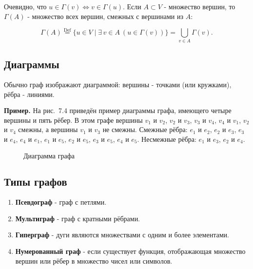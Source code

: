 {Очевидно, что $u \in \Gamma(v) \iff v \in \Gamma(u)$. Если $A \subset V$ - множество вершин, то $\Gamma(A)$ - множество всех вершин, смежных с вершинами из $A$:


\[
\Gamma(A) \overset{\text{Def}}{=} \{ u \in V \mid \exists \, v \in A\ (u \in \Gamma(v)) \} = \bigcup_{v \in A} \Gamma(v).
\]

\subsection*{Диаграммы}

Обычно граф изображают диаграммой: вершины - точками (или кружками), рёбра - линиями.

\textbf{Пример.} На рис.~7.4 приведён пример диаграммы графа, имеющего четыре вершины и пять рёбер.
В этом графе вершины $v_1$ и $v_2$, $v_2$ и $v_3$, $v_3$ и $v_4$, $v_4$ и $v_1$, $v_2$ и $v_4$ смежны, а вершины $v_1$ и $v_3$ не смежны.
Смежные рёбра: $e_1$ и $e_2$, $e_2$ и $e_3$, $e_3$ и $e_4$, $e_4$ и $e_1$, $e_1$ и $e_5$, $e_2$ и $e_5$, $e_3$ и $e_5$, $e_4$ и $e_5$.
Несмежные рёбра: $e_1$ и $e_3$, $e_2$ и $e_4$.

\begin{figure}[h]
  \centering
  \caption{Диаграмма графа}
\end{figure}

\subsection*{Типы графов}

\begin{enumerate}
    \item \textbf{Псевдограф} - граф с петлями.
    \item \textbf{Мультиграф} - граф с кратными рёбрами.
    \item \textbf{Гиперграф} - дуги являются множествами с одним и более элементами.
    \item \textbf{Нумерованный граф} - если существует функция, отображающая множество вершин или рёбер в множество чисел или символов.
\end{enumerate}

}
